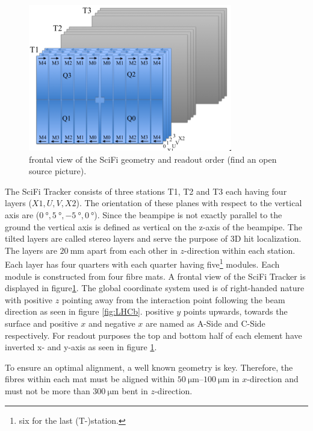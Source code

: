 \begin{figure}
  \centering
  \includegraphics{plots/SciFi_Tracker.png}
  \caption{frontal view of the SciFi geometry and readout order (find an open source picture).}
  \label{fig:scifi}
\end{figure}

The SciFi Tracker consists of three stations T1, T2 and T3 each having four layers ($X1, U, V, X2$). The orientation of these planes with respect to the vertical axis are ($\SI{0}{\degree}, \SI{+5}{\degree}, \SI{-5}{\degree}, \SI{0}{\degree}$).
Since the beampipe is not exactly parallel to the ground the vertical axis is
defined as vertical on the z-axis of the beampipe.
The tilted layers are called stereo layers and serve the purpose of 3D hit localization.
The layers are $\SI{20}{\milli\metre}$ apart from each other in $z$-direction within each station.
Each layer has four quarters with each quarter having five\footnote{six for the last (T-)station.} modules. Each module is constructed from four fibre mats.
A frontal view of the SciFi Tracker is displayed in figure\ref{fig:scifi}.
The global coordinate system used is of right-handed nature with positive $z$ pointing away from the interaction point following the beam direction as seen in figure \ref{fig:LHCb}. positive $y$ points upwards, towards the surface and positive $x$ and negative $x$ are named as A-Side and C-Side respectively\cite{scifiInfo}.
For readout purposes the top and bottom half of each element have inverted x- and y-axis as seen in figure \ref{fig:scifi}.

To ensure an optimal alignment, a well known geometry is key. Therefore, the
fibres within each mat must be aligned within $\SIrange{50}{100}{\micro\metre}$ in $x$-direction and must not be more than $\SI{300}{\micro\metre}$ bent in $z$-direction.

